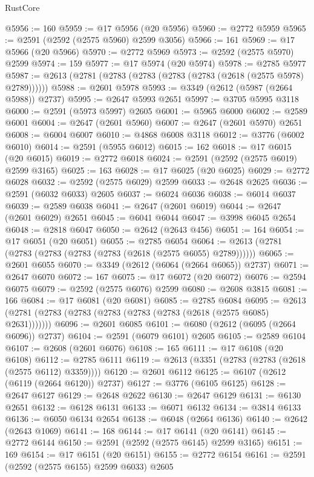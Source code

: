\begin{lexlean}{RustCore}
\begin{coremodule}
@5956 := 160
@5959 := @17 @5956 (@20 @5956)
@5960 := @2772 @5959
@5965 := @2591 (@2592 (@2575 @5960) @2599 @3056)
@5966 := 161
@5969 := @17 @5966 (@20 @5966)
@5970 := @2772 @5969
@5973 := @2592 (@2575 @5970) @2599
@5974 := 159
@5977 := @17 @5974 (@20 @5974)
@5978 := @2785 @5977
@5987 := @2613 (@2781 (@2783 (@2783 (@2783 (@2783 (@2618 (@2575 @5978) @2789))))))
@5988 := @2601 @5978
@5993 := @3349 (@2612 (@5987 (@2664 @5988)) @2737)
@5995 := @2647 @5993 @2651
@5997 := @3705 @5995 @3118
@6000 := @2591 (@5973 @5997) @2605
@6001 := @5965 @6000
@6002 := @2589 @6001
@6004 := @2647 (@2601 @5960)
@6007 := @2647 (@2601 @5970) @2651
@6008 := @6004 @6007
@6010 := @4868 @6008 @3118
@6012 := @3776 (@6002 @6010)
@6014 := @2591 (@5955 @6012)
@6015 := 162
@6018 := @17 @6015 (@20 @6015)
@6019 := @2772 @6018
@6024 := @2591 (@2592 (@2575 @6019) @2599 @3165)
@6025 := 163
@6028 := @17 @6025 (@20 @6025)
@6029 := @2772 @6028
@6032 := @2592 (@2575 @6029) @2599
@6033 := @2648 @2625
@6036 := @2591 (@6032 @6033) @2605
@6037 := @6024 @6036
@6038 := @6014 @6037
@6039 := @2589 @6038
@6041 := @2647 (@2601 @6019)
@6044 := @2647 (@2601 @6029) @2651
@6045 := @6041 @6044
@6047 := @3998 @6045 @2654
@6048 := @2818 @6047
@6050 := @2642 (@2643 @456)
@6051 := 164
@6054 := @17 @6051 (@20 @6051)
@6055 := @2785 @6054
@6064 := @2613 (@2781 (@2783 (@2783 (@2783 (@2783 (@2618 (@2575 @6055) @2789))))))
@6065 := @2601 @6055
@6070 := @3349 (@2612 (@6064 (@2664 @6065)) @2737)
@6071 := @2647 @6070
@6072 := 167
@6075 := @17 @6072 (@20 @6072)
@6076 := @2594 @6075
@6079 := @2592 (@2575 @6076) @2599
@6080 := @2608 @3815
@6081 := 166
@6084 := @17 @6081 (@20 @6081)
@6085 := @2785 @6084
@6095 := @2613 (@2781 (@2783 (@2783 (@2783 (@2783 (@2783 (@2618 (@2575 @6085) @2631)))))))
@6096 := @2601 @6085
@6101 := @6080 (@2612 (@6095 (@2664 @6096)) @2737)
@6104 := @2591 (@6079 @6101) @2605
@6105 := @2589 @6104
@6107 := @2608 (@2601 @6076)
@6108 := 165
@6111 := @17 @6108 (@20 @6108)
@6112 := @2785 @6111
@6119 := @2613 (@3351 (@2783 (@2783 (@2618 (@2575 @6112) @3359))))
@6120 := @2601 @6112
@6125 := @6107 (@2612 (@6119 (@2664 @6120)) @2737)
@6127 := @3776 (@6105 @6125)
@6128 := @2647 @6127
@6129 := @2648 @2622
@6130 := @2647 @6129
@6131 := @6130 @2651
@6132 := @6128 @6131
@6133 := @6071 @6132
@6134 := @3814 @6133
@6136 := @6050 @6134 @2654
@6138 := @6048 (@2664 @6136)
@6140 := @2642 (@2643 @1069)
@6141 := 168
@6144 := @17 @6141 (@20 @6141)
@6145 := @2772 @6144
@6150 := @2591 (@2592 (@2575 @6145) @2599 @3165)
@6151 := 169
@6154 := @17 @6151 (@20 @6151)
@6155 := @2772 @6154
@6161 := @2591 (@2592 (@2575 @6155) @2599 @6033) @2605

\end{coremodule}
\end{lexlean}
